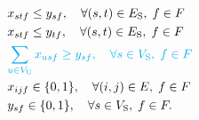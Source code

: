 \documentclass[10pt, letterpaper]{IEEEtran}
\newcommand\cyan[1]{\textcolor{cyan}{#1}}
\begin{document}
\begin{CJK}{UTF8}{ipxm}
{\begin{subequations}
\begin{align}
  &x_{stf} \le y_{sf}, \quad \forall (s,t) \in E_{\rm{S}}, \; f \in F \label{OSA-PSO j} \\
  &x_{stf} \le y_{tf}, \quad \forall (s,t) \in E_{\rm{S}}, \; f \in F \label{OSA-PSO k} \\
  &\cyan{\sum_{u \in V_{\rm{U}}} x_{usf} \geq y_{sf} , \quad \forall s \in V_{\rm{S}}, \; f \in F} \label{OSA-PSO l} \\
  &x_{ijf} \in \{0,1\}, \quad \forall (i,j) \in E, \; f \in F \label{OSA-PSO m} \\
  &y_{sf} \in \{0,1\}, \quad \forall s \in V_{\rm{S}}, \; f \in F. \label{OSA-PSO n}
  \end{align}
\end{subequations}
}

\end{CJK}
\end{document}
